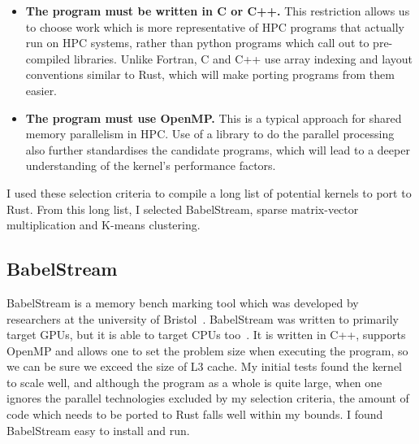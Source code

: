 \begin{itemize}
  \item \textbf{The program must be written in C or C++.} This restriction allows us to choose work which is more representative of HPC programs that actually run on HPC systems, rather than python programs which call out to pre-compiled libraries. Unlike Fortran, C and C++ use array indexing and layout conventions similar to Rust, which will make porting programs from them easier.

  \item \textbf{The program must use OpenMP.} This is a typical approach for shared memory parallelism in HPC\@. Use of a library to do the parallel processing also further standardises the candidate programs, which will lead to a deeper understanding of the kernel's performance factors.
\end{itemize}

I used these selection criteria to compile a long list of potential kernels to port to Rust. From this long list, I selected BabelStream, sparse matrix-vector multiplication and K-means clustering.

\subsection{BabelStream}

BabelStream is a memory bench marking tool which was developed by researchers at the university of Bristol~\cite{Babel2018}. BabelStream was written to primarily target GPUs, but it is able to target CPUs too~\cite{BabelStream}.
It is written in C++, supports OpenMP and allows one to set the problem size when executing the program, so we can be sure we exceed the size of L3 cache. My initial tests found the kernel to scale well, and although the program as a whole is quite large, when one ignores the parallel technologies excluded by my selection criteria, the amount of code which needs to be ported to Rust falls well within my bounds. I found BabelStream easy to install and run.

